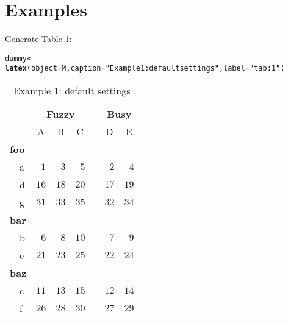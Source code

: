 \documentclass{article}\usepackage[]{graphicx}\usepackage[]{color}
\makeatletter
\newcommand{\hlstr}[1]{\textcolor[rgb]{0.192,0.494,0.8}{#1}}%
\newcommand{\hlstd}[1]{\textcolor[rgb]{0.345,0.345,0.345}{#1}}%
\newcommand{\hlkwb}[1]{\textcolor[rgb]{0.69,0.353,0.396}{#1}}%
\newcommand{\hlkwc}[1]{\textcolor[rgb]{0.333,0.667,0.333}{#1}}%
\newcommand{\hlkwd}[1]{\textcolor[rgb]{0.737,0.353,0.396}{\textbf{#1}}}%
\newenvironment{kframe}{%
 \def\at@end@of@kframe{}%
 \ifinner\ifhmode%
  \def\at@end@of@kframe{\end{minipage}}%
  \begin{minipage}{\columnwidth}%
 \fi\fi%
 \def\FrameCommand##1{\hskip\@totalleftmargin \hskip-\fboxsep
 \colorbox{shadecolor}{##1}\hskip-\fboxsep
     \hskip-\linewidth \hskip-\@totalleftmargin \hskip\columnwidth}%
 \MakeFramed {\advance\hsize-\width
   \@totalleftmargin\z@ \linewidth\hsize
   \@setminipage}}%
 {\par\unskip\endMakeFramed%
 \at@end@of@kframe}
\makeatother
\begin{document}
\section{Examples}
Generate Table \ref{tab:1}:
\begin{kframe}
\begin{alltt}
\hlstd{dummy} \hlkwb{<-} \hlkwd{latex}\hlstd{(}\hlkwc{object}\hlstd{=M,} \hlkwc{caption}\hlstd{=}\hlstr{"Example 1: default settings"}\hlstd{,} \hlkwc{label}\hlstd{=}\hlstr{"tab:1"}\hlstd{)}
\end{alltt}
\end{kframe}%
\begin{table}[!tbp]
\caption{Example 1: default settings\label{tab:1}} 
\begin{center}
\begin{tabular}{lrrrcrr}
\hline\hline
\multicolumn{1}{l}{\bfseries }&\multicolumn{3}{c}{\bfseries Fuzzy}&\multicolumn{1}{c}{\bfseries }&\multicolumn{2}{c}{\bfseries Busy}\tabularnewline
\cline{2-4} \cline{6-7}
\multicolumn{1}{l}{}&\multicolumn{1}{c}{A}&\multicolumn{1}{c}{B}&\multicolumn{1}{c}{C}&\multicolumn{1}{c}{}&\multicolumn{1}{c}{D}&\multicolumn{1}{c}{E}\tabularnewline
\hline
{\bfseries foo}&&&&&&\tabularnewline
~~a&$ 1$&$ 3$&$ 5$&&$ 2$&$ 4$\tabularnewline
~~d&$16$&$18$&$20$&&$17$&$19$\tabularnewline
~~g&$31$&$33$&$35$&&$32$&$34$\tabularnewline
\hline
{\bfseries bar}&&&&&&\tabularnewline
~~b&$ 6$&$ 8$&$10$&&$ 7$&$ 9$\tabularnewline
~~e&$21$&$23$&$25$&&$22$&$24$\tabularnewline
\hline
{\bfseries baz}&&&&&&\tabularnewline
~~c&$11$&$13$&$15$&&$12$&$14$\tabularnewline
~~f&$26$&$28$&$30$&&$27$&$29$\tabularnewline
\hline
\end{tabular}\end{center}

\end{table}
\end{document}
